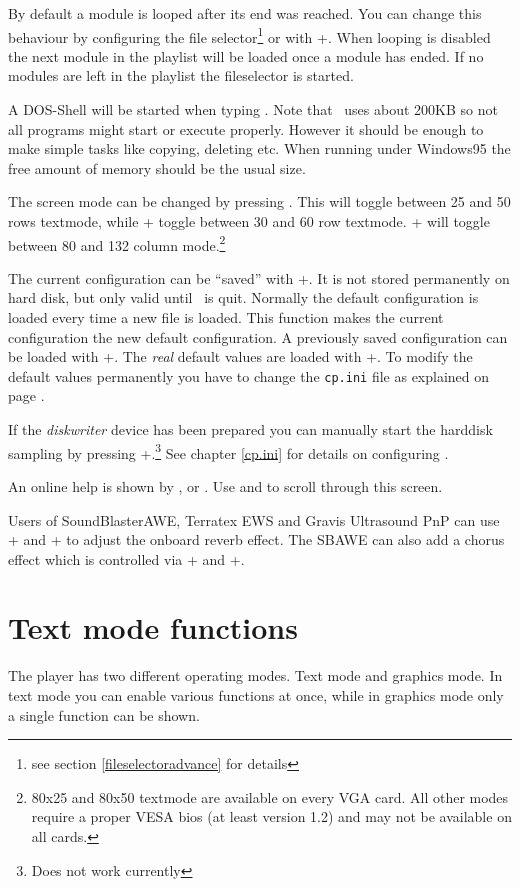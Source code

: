 By default a module is looped after its end was reached. You can change this
behaviour by configuring the file selector\footnote{see section
\ref{fileselectoradvance} for details} or with +. When
looping is disabled the next module in the playlist will be loaded once a
module has ended. If no modules are left in the playlist the fileselector is
started.

A DOS-Shell will be started when typing . Note that \cp\ uses about
200KB so not all programs might start or execute properly. However it should
be enough to make simple tasks like copying, deleting etc. When running under
Windows95 the free amount of memory should be the usual size.

The screen mode can be changed by pressing . This will toggle
between 25 and 50 rows textmode, while
+ toggle between 30 and 60 row textmode.
+ will toggle between 80 and 132 column mode.\footnote{80x25
and 80x50 textmode are available on every VGA card. All other modes require a
proper VESA bios (at least version 1.2) and may not be available on all cards.}

The current configuration can be ``saved'' with +. It is
not stored permanently on hard disk, but only valid until \cp\ is quit. Normally
the default configuration is loaded every time a new file is loaded. This
function makes the current configuration the new default configuration. A
previously saved configuration can be loaded with +. The
\emph{real} default values are loaded with +. To modify
the default values permanently you have to change the \texttt{cp.ini} file
as explained on page \pageref{cp.ini}.

If the \emph{diskwriter} device has been prepared you can manually start the
harddisk sampling by pressing +.\footnote{Does not work
currently} See chapter \ref{cp.ini} for details on configuring \cp.

An online help is shown by ,  or . Use
 and
 to scroll through this screen.

Users of SoundBlasterAWE, Terratex EWS and Gravis Ultrasound PnP can
use + and + to adjust the
onboard reverb effect. The SBAWE can also add a chorus effect which is
controlled via + and
+.

\section{Text mode functions}
The player has two different operating modes. Text mode and graphics
mode. In text mode you can enable various functions at once, while in
graphics mode only a single function can be shown.

